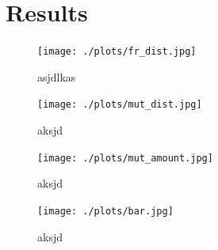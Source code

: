 \documentclass[12pt]{article}
\begin{document}
\newpage
\section{Results}\label{sec:results}


\begin{figure}[htpb]
    \centering
    \texttt{[image: ./plots/fr\_dist.jpg]}
    \caption{asjdlkas}
    \label{fig:-plots-fr_dist-jpg}
\end{figure}    

\begin{figure}[h]
    \centering
    \begin{minipage}[t]{0.45\textwidth} 
    \centering
    \texttt{[image: ./plots/mut\_dist.jpg]}
    \caption{aksjd}
    \label{fig:-plots-mut_dist-jpg}
    \end{minipage}
    \hfill
    \begin{minipage}[t]{0.45\textwidth}
    \centering
    \texttt{[image: ./plots/mut\_amount.jpg]}
    \caption{aksjd}
    \label{fig:-plots-mut_amount-jpg}
    \end{minipage}
\end{figure}

\begin{figure}[htpb]
    \centering
    \texttt{[image: ./plots/bar.jpg]}
    \caption{aksjd}
    \label{fig:-plots-mut_bar-jpg}
\end{figure}





\end{document}
